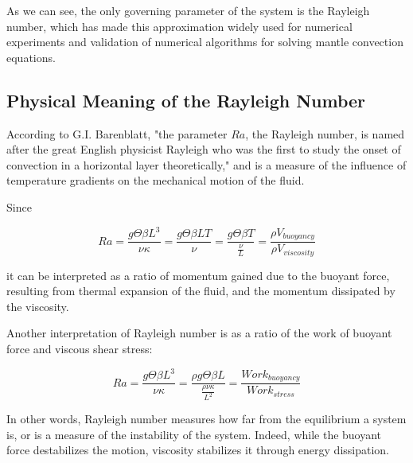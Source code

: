 As we can see, the only governing parameter of the system is the Rayleigh number, which has made this approximation widely used for numerical experiments and validation of numerical algorithms for solving mantle convection equations.

\subsection{Physical Meaning of the Rayleigh Number}

According to G.I. Barenblatt, "the parameter $Ra$, the Rayleigh number, is named after the great English physicist Rayleigh who was the first to study the onset of convection in a horizontal layer theoretically," \cite[p. 47]{barenblatt1} and is a measure of the influence of temperature gradients on the mechanical motion of the fluid. 

Since

$$ Ra = \frac{g\Theta \beta L^3}{\nu\kappa} = \frac{g\Theta \beta L T}{\nu} = \frac{g\Theta \beta T}{\frac{\nu}{L}} = \frac{\rho V_{buoyancy}}{\rho V_{viscosity}} $$

it can be interpreted as a ratio of momentum gained due to the buoyant force, resulting from thermal expansion of the fluid, and the momentum dissipated by the viscosity. 

Another interpretation of Rayleigh number is as a ratio of the work of buoyant force and viscous shear stress:

$$ Ra = \frac{g\Theta \beta L^3}{\nu\kappa} = \frac{\rho g\Theta \beta L}{\frac{\rho \nu \kappa}{L^2}} = \frac{Work_{buoyancy}}{Work_{stress}} $$

In other words, Rayleigh number measures how far from the equilibrium a system is, or is a measure of the instability of the system. Indeed, while the buoyant force destabilizes the motion, viscosity stabilizes it through energy dissipation.